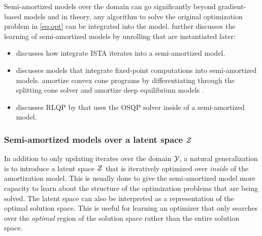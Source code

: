 Semi-amortized models over the domain can go significantly beyond
gradient-based models and in theory, any algorithm to solve
the original optimization problem in \cref{eq:opt}
can be integrated into the model.
 further discusses the learning of
semi-amortized models by unrolling that are instantiated later:
\begin{itemize}
\item {} discusses how
\citet{gregor2010learning} integrate ISTA iterates
\citep{daubechies2004iterative,beck2009fast}
into a semi-amortized model.
\item {} discusses models that integrate
fixed-point computations into semi-amortized models.
\citet{venkataraman2021neural} amortize convex cone programs by
differentiating through the splitting cone solver \citep{o2016conic}
and \citet{bai2022neural} amortize
deep equilibrium models \citep{bai2019deep,bai2020multiscale}.
\item {} discusses RLQP by \citet{ichnowski2021accelerating}
  that uses the OSQP solver \citep{stellato2018osqp} inside
  of a semi-amortized model.
\end{itemize}

\subsubsection{Semi-amortized models over a latent space ${\mathcal{Z}}$}
\label{sec:semi-latent}
\begin{center}
\end{center}
\vspace{-3mm}

In addition to only updating iterates over the domain ${\mathcal{Y}}$,
a natural generalization is to introduce a latent space ${\mathcal{Z}}$
that is iteratively optimized over \emph{inside} of
the amortization model.
This is usually done to give the semi-amortized model
more capacity to learn about the structure of the optimization
problems that are being solved.
The latent space can also be interpreted as a representation
of the optimal solution space.
This is useful for learning an optimizer that only searches
over the \emph{optimal} region of the solution space rather
than the entire solution space.

